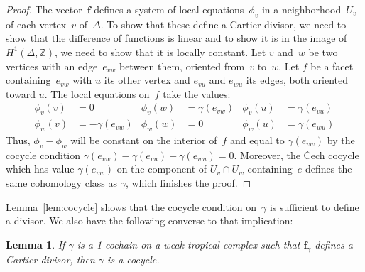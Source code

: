 \documentclass[11pt]{amsart}
\newtheorem{lem}[thm]{Lemma}
\theoremstyle{definition}
\newcommand{\bff}{\mathbf f}
\newcommand{\ZZ}{\mathbb Z}
\begin{document}
\begin{proof}
The vector~$\bff$ defines a system of local equations~$\phi_v$ in a
neighborhood~$U_v$ of each vertex~$v$ of~$\Delta$. To show that these define a
Cartier divisor, we need to show that the difference of functions is linear and
to show it is in the image of $H^1(\Delta, \ZZ)$, we need to show that it is
locally constant. Let $v$ and~$w$ be two vertices with an edge~$e_{vw}$ between
them, oriented from~$v$ to~$w$. Let $f$ be a facet containing~$e_{vw}$ with $u$
its other vertex and $e_{vu}$ and $e_{wu}$ its edges, both oriented toward $u$.
The local equations on~$f$ take the values:
\begin{align*}
\phi_v(v) &= 0 & \phi_v(w) &= \gamma(e_{vw}) & \phi_v(u) &= \gamma(e_{vu}) \\
\phi_w(v) &= -\gamma(e_{vw}) & \phi_w(w) &= 0 & \phi_w(u) &= \gamma(e_{wu})
\end{align*}
Thus, $\phi_v - \phi_w$ will be constant on the interior of~$f$ and equal to
$\gamma(e_{vw})$ by the cocycle condition $\gamma(e_{vw}) - \gamma(e_{vu}) +
\gamma(e_{wu}) = 0$. Moreover, the \v Cech cocycle which has value
$\gamma(e_{vw})$ on the component of $U_v \cap U_w$ containing~$e$ defines the
same cohomology class as $\gamma$, which finishes the proof.
\end{proof}

Lemma~\ref{lem:cocycle} shows that the cocycle condition on~$\gamma$ is
sufficient to define a divisor. We also have the following converse to that
implication:

\begin{lem}\label{lem:criterion-alg-trival}
If $\gamma$ is a 1-cochain on a weak tropical complex such that $\bff_\gamma$
defines a Cartier divisor, then $\gamma$ is a cocycle.
\end{lem}
\end{document}
